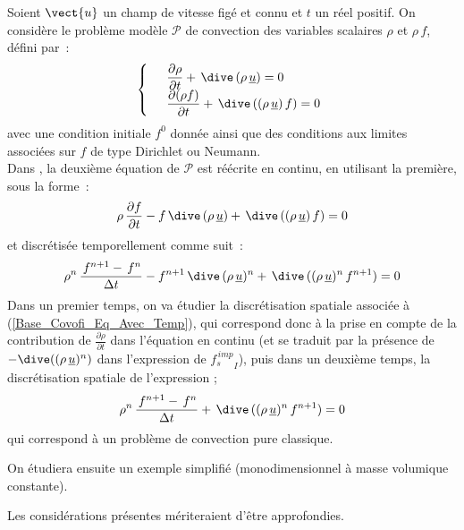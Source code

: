 Soient $\vect{u}$ un champ de vitesse figé et connu et $t$ un réel
positif. On considère le
problème modèle $\mathcal{P}$ de convection des variables scalaires $\rho$ et $\rho\,f$, défini par~:
\begin{equation}
\left\{\begin{array}{ll}
&\displaystyle \frac {\partial \rho}{\partial t} + \,\dive\,(\rho\,\underline{u}) = 0\\
&\displaystyle \frac {\partial  (\rho f)}{\partial t} + \,\dive\,((\rho\,\underline{u})\,f) = 0
\end{array}\right.
\end{equation}
avec une condition initiale $f^0$ donnée ainsi que des conditions aux
limites associées sur $f$ de type Dirichlet ou Neumann.\\
Dans \CS , la deuxième équation de $\mathcal{P}$ est réécrite en
continu, en utilisant la première, sous la forme~:\\
\begin{equation}
\displaystyle \rho\,\frac {\partial f}{\partial t} -
f\,\dive\,(\rho\,\underline{u}) + \,\dive\,((\rho\,\underline{u})\,f) = 0
\end{equation}
et discrétisée temporellement comme suit~:
\begin{equation}\label{Base_Covofi_Eq_Avec_Temp}
\displaystyle \rho^n \,\frac {\,f^{n+1} -\,f^n}{\Delta t} -
f^{n+1}\,\dive\,(\rho\,\underline{u})^n + \,\dive\,((\rho\,\underline{u})^n\,f^{n+1}) = 0
\end{equation}
Dans un premier temps, on va étudier la discrétisation spatiale associée
à (\ref{Base_Covofi_Eq_Avec_Temp}), qui correspond donc à la prise en compte de la
contribution de $\displaystyle\frac{\partial \rho}{\partial t}$ dans
l'équation en continu (et se traduit par la présence de
$-\dive((\rho\,\underline{u})^{n})$ dans l'expression de ${f_s^{\,imp}}_I $),
puis dans un deuxième temps, la discrétisation spatiale de l'expression ;\\
\begin{equation}\label{Base_Covofi_Eq_Sans_Temp}
\displaystyle \rho^n \,\frac {\,f^{n+1} -\,f^n}{\Delta t} +
\,\dive\,((\rho\,\underline{u})^n\,f^{n+1}) = 0
\end{equation}
qui correspond à un problème de convection pure classique.

On étudiera ensuite un exemple simplifié (monodimensionnel à masse
volumique constante).


Les considérations présentes mériteraient d'être approfondies.


